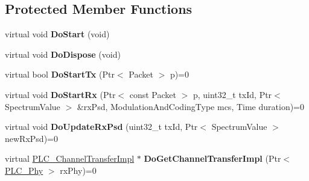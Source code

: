 \subsection*{\-Protected \-Member \-Functions}
\begin{DoxyCompactItemize}
\item 
\hypertarget{classns3_1_1PLC__Phy_a614fcc21473fed15ea0a56f86a0e3628}{virtual void {\bfseries \-Do\-Start} (void)}\label{classns3_1_1PLC__Phy_a614fcc21473fed15ea0a56f86a0e3628}

\item 
\hypertarget{classns3_1_1PLC__Phy_a5654398d73868f256bd338a5bd64229f}{virtual void {\bfseries \-Do\-Dispose} (void)}\label{classns3_1_1PLC__Phy_a5654398d73868f256bd338a5bd64229f}

\item 
\hypertarget{classns3_1_1PLC__Phy_a29adea495ce0dfd3299766982ed5b0fe}{virtual bool {\bfseries \-Do\-Start\-Tx} (\-Ptr$<$ \-Packet $>$ p)=0}\label{classns3_1_1PLC__Phy_a29adea495ce0dfd3299766982ed5b0fe}

\item 
\hypertarget{classns3_1_1PLC__Phy_a446953e5279dd63f8cf4bde85993504f}{virtual void {\bfseries \-Do\-Start\-Rx} (\-Ptr$<$ const \-Packet $>$ p, uint32\-\_\-t tx\-Id, \-Ptr$<$ \-Spectrum\-Value $>$ \&rx\-Psd, \-Modulation\-And\-Coding\-Type mcs, \-Time duration)=0}\label{classns3_1_1PLC__Phy_a446953e5279dd63f8cf4bde85993504f}

\item 
\hypertarget{classns3_1_1PLC__Phy_ad2137025b97803e834683d9a1eed897e}{virtual void {\bfseries \-Do\-Update\-Rx\-Psd} (uint32\-\_\-t tx\-Id, \-Ptr$<$ \-Spectrum\-Value $>$ new\-Rx\-Psd)=0}\label{classns3_1_1PLC__Phy_ad2137025b97803e834683d9a1eed897e}

\item 
\hypertarget{classns3_1_1PLC__Phy_ac539a2e014f1ed6a532ee79e7e4f1ea0}{virtual \hyperlink{classns3_1_1PLC__ChannelTransferImpl}{\-P\-L\-C\-\_\-\-Channel\-Transfer\-Impl} $\ast$ {\bfseries \-Do\-Get\-Channel\-Transfer\-Impl} (\-Ptr$<$ \hyperlink{classns3_1_1PLC__Phy}{\-P\-L\-C\-\_\-\-Phy} $>$ rx\-Phy)=0}\label{classns3_1_1PLC__Phy_ac539a2e014f1ed6a532ee79e7e4f1ea0}

\end{DoxyCompactItemize}
